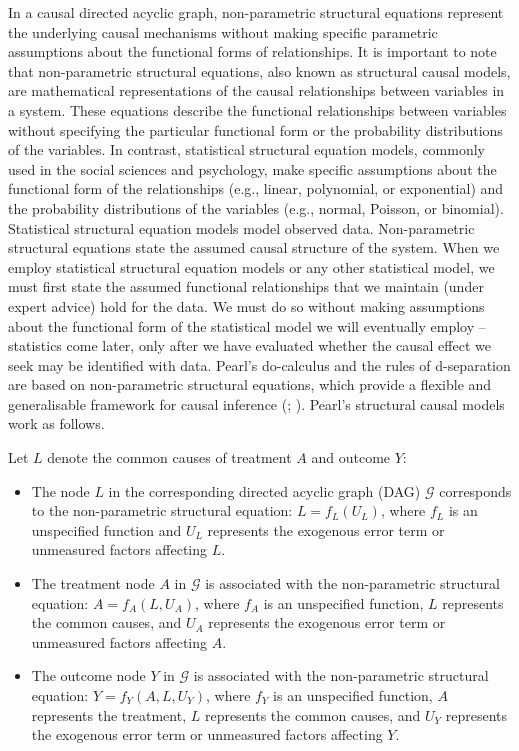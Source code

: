 \documentclass[
  single column]{article}
\providecommand{\tightlist}{%
  \setlength{\itemsep}{0pt}\setlength{\parskip}{0pt}}\usepackage{longtable,booktabs,array}
\begin{document}
In a causal directed acyclic graph, non-parametric structural equations
represent the underlying causal mechanisms without making specific
parametric assumptions about the functional forms of relationships. It
is important to note that non-parametric structural equations, also
known as structural causal models, are mathematical representations of
the causal relationships between variables in a system. These equations
describe the functional relationships between variables without
specifying the particular functional form or the probability
distributions of the variables. In contrast, statistical structural
equation models, commonly used in the social sciences and psychology,
make specific assumptions about the functional form of the relationships
(e.g., linear, polynomial, or exponential) and the probability
distributions of the variables (e.g., normal, Poisson, or binomial).
Statistical structural equation models model observed data.
Non-parametric structural equations state the assumed causal structure
of the system. When we employ statistical structural equation models or
any other statistical model, we must first state the assumed functional
relationships that we maintain (under expert advice) hold for the data.
We must do so without making assumptions about the functional form of
the statistical model we will eventually employ -- statistics come
later, only after we have evaluated whether the causal effect we seek
may be identified with data. Pearl's do-calculus and the rules of
d-separation are based on non-parametric structural equations, which
provide a flexible and generalisable framework for causal inference
(;
). Pearl's
structural causal models work as follows.

Let \(L\) denote the common causes of treatment \(A\) and outcome \(Y\):

\begin{itemize}
\tightlist
\item
  The node \(L\) in the corresponding directed acyclic graph (DAG)
  \(\mathcal{G}\) corresponds to the non-parametric structural equation:
  \(L = f_L(U_L)\), where \(f_L\) is an unspecified function and \(U_L\)
  represents the exogenous error term or unmeasured factors affecting
  \(L\).
\item
  The treatment node \(A\) in \(\mathcal{G}\) is associated with the
  non-parametric structural equation: \(A = f_A(L, U_A)\), where \(f_A\)
  is an unspecified function, \(L\) represents the common causes, and
  \(U_A\) represents the exogenous error term or unmeasured factors
  affecting \(A\).
\item
  The outcome node \(Y\) in \(\mathcal{G}\) is associated with the
  non-parametric structural equation: \(Y = f_Y(A, L, U_Y)\), where
  \(f_Y\) is an unspecified function, \(A\) represents the treatment,
  \(L\) represents the common causes, and \(U_Y\) represents the
  exogenous error term or unmeasured factors affecting \(Y\).
\end{itemize}
\end{document}
